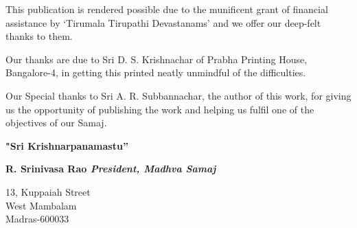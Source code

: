 This publication is rendered possible due to the munificent grant of financial assistance by `Tirumala Tirupathi Devastanams' and we offer our deep-felt thanks to them.

Our thanks are due to Sri D. S. Krishnachar of Prabha Printing House, Bangalore-4, in getting this printed neatly unmindful of the difficulties.

\eject

Our Special thanks to Sri A. R. Subbannachar, the author of this work, for giving us the opportunity of publishing the work and helping us fulfil one of the objectives of our Samaj.

\begin{center}
\textbf{"Sri Krishnarpanamastu”}
\end{center}

\begin{flushright}
\textbf{R. Srinivasa Rao \textit{President, Madhva Samaj}}
\end{flushright}

\begin{flushleft}
13, Kuppaiah Street \\ West Mambalam \\ Madras-600033
\end{flushleft}

